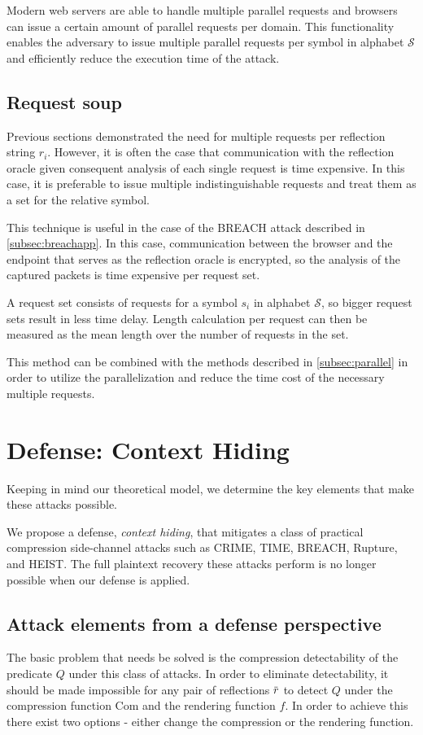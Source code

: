 \documentclass[conference, letterpaper, 10pt]{IEEEtran}
\newcommand{\overbar}[1]{\mkern 1.5mu\overline{\mkern-1.5mu#1\mkern-1.5mu}\mkern 1.5mu}
\begin{document}
Modern web servers are able to handle multiple parallel requests and
browsers can issue a certain amount of parallel requests per domain. This
functionality enables the adversary to issue multiple parallel requests per
symbol in alphabet $\mathcal{S}$ and efficiently reduce the execution time of
the attack.

\subsection{Request soup}
Previous sections demonstrated the need for multiple requests per reflection
string $r_i$. However, it is often the case that communication with the
reflection oracle given consequent analysis of each single request is time
expensive. In this case, it is preferable to issue multiple indistinguishable
requests and treat them as a set for the relative symbol.

This technique is useful in the case of the BREACH attack described in
\ref{subsec:breachapp}. In this case, communication between the browser and the
endpoint that serves as the reflection oracle is encrypted, so the analysis of
the captured packets is time expensive per request set.

A request set consists of requests for a symbol $s_i$ in alphabet $\mathcal{S}$,
so bigger request sets result in less time delay. Length calculation per request
can then be measured as the mean length over the number of requests in the set.

This method can be combined with the methods described in \ref{subsec:parallel}
in order to utilize the parallelization and reduce the time cost of the
necessary multiple requests.

\section{Defense: Context Hiding}\label{sec:defense}
Keeping in mind our theoretical model, we determine the key elements that make these
attacks possible.

We propose a defense, \textit{context hiding}, that mitigates a class of
practical compression side-channel attacks such as CRIME, TIME, BREACH, Rupture,
and HEIST. The full plaintext recovery these attacks perform is no longer
possible when our defense is applied.

\subsection{Attack elements from a defense perspective}
The basic problem that needs be solved is the compression detectability of
the predicate $Q$ under this class of attacks. In order to eliminate detectability,
it should be made impossible for any pair of reflections $\overbar{r}$ to detect
$Q$ under the compression function $\textrm{Com}$ and the rendering function $f$. In order to
achieve this there exist two options - either change the compression or the
rendering function.
\end{document}

